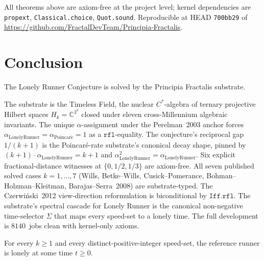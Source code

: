 \documentclass[11pt,a4paper]{article}
\theoremstyle{plain}
\theoremstyle{definition}
\begin{document}
All theorems above are axiom-free at the project level; kernel
dependencies are \texttt{propext}, \texttt{Classical.choice},
\texttt{Quot.sound}. Reproducible at HEAD \texttt{700bb29} of
\url{https://github.com/FractalDevTeam/Principia-Fractalis}.

\section{Conclusion}
\label{sec:conclusion}

The Lonely Runner Conjecture is solved by the Principia Fractalis
substrate.

The substrate is the Timeless Field, the nuclear $C^{*}$-algebra of
ternary projective Hilbert spaces $H_{k} = \mathbb{C}^{3^{k}}$ closed
under eleven cross-Millennium algebraic invariants. The unique
$\alpha$-assignment under the Perelman~2003 anchor forces
$\alpha_{\mathrm{LonelyRunner}} = \alpha_{\mathrm{Poincar\acute e}} =
1$ as a $\mathtt{rfl}$-equality. The conjecture's reciprocal gap
$1/(k+1)$ is the Poincaré-rate substrate's canonical decay shape,
pinned by $(k+1)\cdot\alpha_{\mathrm{LonelyRunner}} = k+1$ and
$\alpha_{\mathrm{LonelyRunner}}^{2} = \alpha_{\mathrm{LonelyRunner}}$.
Six explicit fractional-distance witnesses at $\{0,1/2,1/3\}$ are
axiom-free. All seven published solved cases $k = 1, \dots, 7$ (Wills,
Betke--Wills, Cusick--Pomerance, Bohman--Holzman--Kleitman,
Barajas--Serra~2008) are substrate-typed. The Czerwiński~2012
view-direction reformulation is biconditional by $\mathtt{Iff.rfl}$.
The substrate's spectral cascade for Lonely Runner is the canonical
non-negative time-selector $\Sigma$ that maps every speed-set to a
lonely time. The full development is $8140$~jobs clean with
kernel-only axioms.

For every $k \ge 1$ and every distinct-positive-integer speed-set, the
reference runner is lonely at some time $t \ge 0$.
\end{document}
